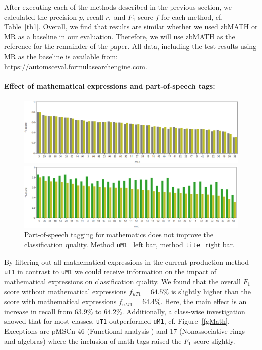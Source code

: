 After executing each of the methods described in the previous section, we calculated the precision \(p\), recall \(r,\) and \(F_{1}\) score \(f\) for each method, cf. Table~\ref{tb1}.
Overall, we find that results are similar whether we used zbMATH or MR as a baseline in our evaluation.
Therefore, we will use zbMATH as the reference for the remainder of the paper. All data, including the test results using MR as the baseline is available from: \url{https://automsceval.formulasearchengine.com}.


\paragraph{Effect of mathematical expressions and part-of-speech tags:}
\begin{figure}[ht]
  \centering
  \includegraphics[width=\textwidth]{mathEncoding.png}
  \caption{Mathematical symbols in \texttt{title} and abstract \texttt{text} do not improve the classification quality. Method \texttt{uT1} =left bar; method \texttt{uM1}=right bar%
 }\label{fgMath}
  \includegraphics[width=\textwidth]{POSeffekt.png}
\caption{Part-of-speech tagging for mathematics does not improve the classification quality. Method \texttt{uM1}=left bar, method \texttt{tite}=right bar.}\label{fgPOS}
\end{figure}
By filtering out all mathematical expressions in the current production method \texttt{uT1} in contrast to \texttt{uM1} we could receive information on the impact of mathematical expressions on classification quality.
We found that the overall \(F_{1}\) score without mathematical expressions \(f_{uT1} = 64.5\%\) is slightly higher than the score with mathematical expressions \(f_{uM1} = 64.4\%.\)
Here, the main effect is an increase in recall from \(63.9\%\) to \(64.2\%.\)
Additionally, a class-wise investigation showed that for most classes, \texttt{uT1} outperformed \texttt{uM1}, cf. Figure~\ref{fgMath}.
Exceptions are pMSCn 46 (Functional analysis ) and 17 (Nonassociative rings and algebras) where the inclusion of math tags raised the \(F_{1}\)-score slightly.

